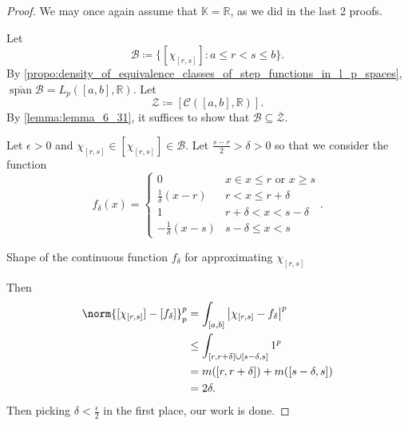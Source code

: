 \documentclass[notoc,notitlepage]{tufte-book}
\DeclareMathOperator{\Span}{span}
\begin{document}
\begin{proof}
  We may once again assume that $\mathbb{K} = \mathbb{R}$,
  as we did in the last 2 proofs.

  Let
  \begin{equation*}
    \mathcal{B} \coloneqq \{ [\chi_{[r, s]}] : a \leq r < s \leq b \}.
  \end{equation*}
  By
  \cref{propo:density_of_equivalence_classes_of_step_functions_in_l_p_spaces},
  $\overline{\Span} \mathcal{B} = L_p([a, b], \mathbb{R})$. Let
  \begin{equation*}
    \mathcal{Z} \coloneqq [\mathcal{C}([a, b], \mathbb{R})].
  \end{equation*}
  By \cref{lemma:lemma_6_31},
  it suffices to show that $\mathcal{B} \subseteq \overline{\mathcal{Z}}$.

  Let $\epsilon > 0$ and $\chi_{[r, s]} \in [\chi_{[r, s]}] \in \mathcal{B}$.
  Let $\frac{s-r}{2} > \delta > 0$ so that we consider the function
  \begin{equation*}
    f_{\delta}(x) = \begin{cases}
      0 & x \in x \leq r \text{ or } x \geq s \\
      \frac{1}{\delta} (x - r) & r < x \leq r + \delta \\
      1 & r + \delta < x < s - \delta \\
      -\frac{1}{\delta}(x - s) & s - \delta \leq x < s
    \end{cases}.
  \end{equation*}
  \begin{marginfigure}
    \centering
    \caption{Shape of the continuous function $f_\delta$ for approximating
    $\chi_{[r, s]}$}\label{fig:shape_of_the_continuous_function_f_delta_for_approximating_chi_r_s}
  \end{marginfigure}
  Then
  \begin{align*}
    \norm{[\chi_{[r, s]}] - [f_\delta]}_p^p
    &= \int_{[a, b]} \abs{\chi_{[r, s]} - f_{\delta}}^p \\
    &\leq \int_{[r, r + \delta] \cup [s - \delta, s]} 1^p \\
    &= m([r, r + \delta]) + m([s - \delta, s]) \\
    &= 2\delta.
  \end{align*}
  Then picking $\delta < \frac{\epsilon}{2}$ in the first place,
  our work is done.
\end{proof}
\end{document}
